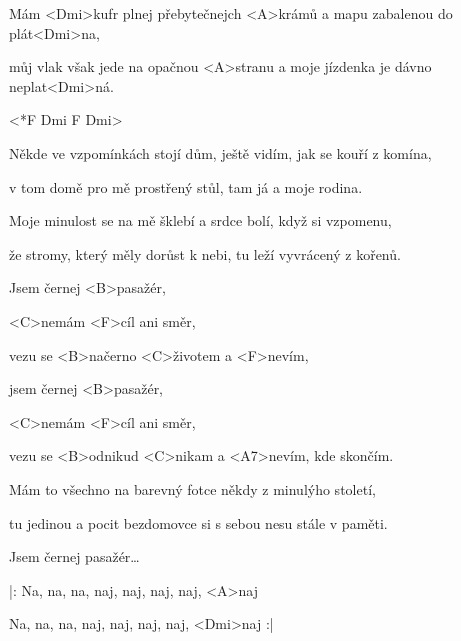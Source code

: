 

\zs
Mám <Dmi>kufr plnej přebytečnejch <A>krámů a mapu zabalenou do plát<Dmi>na, 

můj vlak však jede na opačnou <A>stranu a moje jízdenka je dávno neplat<Dmi>ná. 
\ks

<*F Dmi F Dmi> 

\zs
Někde ve vzpomínkách stojí dům, ještě vidím, jak se kouří z komína,

v tom domě pro mě prostřený stůl, tam já a moje rodina.

Moje minulost se na mě šklebí a srdce bolí, když si vzpomenu,

že stromy, který měly dorůst k nebi, tu leží vyvrácený z kořenů.
\ks

\zr
Jsem černej <B>pasažér,

<C>nemám <F>cíl ani směr,

vezu se <B>načerno <C>životem a <F>nevím,

jsem černej <B>pasažér,

<C>nemám <F>cíl ani směr,

vezu se <B>odnikud <C>nikam a <A7>nevím, kde skončím.
\kr

\zs
Mám to všechno na barevný fotce někdy z minulýho století,

tu jedinou a pocit bezdomovce si s sebou nesu stále v paměti.
\ks

\zr
Jsem černej pasažér…
\kr

\zs
|: Na, na, na, naj, naj, naj, naj, <A>naj
 
Na, na, na, naj, naj, naj, naj, <Dmi>naj :|
\ks

\kp

